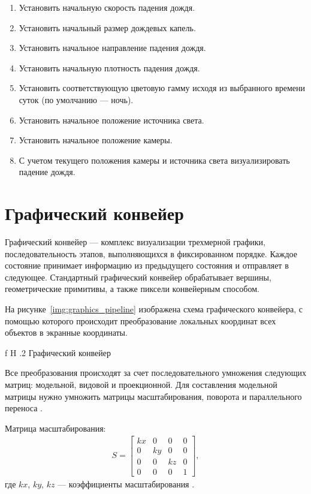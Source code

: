 \begin{enumerate}
\item Установить начальную скорость падения дождя.
\item Установить начальный размер дождевых капель.
\item Установить начальное направление падения дождя.
\item Установить начальную плотность падения дождя.
\item Установить соответствующую цветовую гамму исходя из выбранного времени суток (по умолчанию --- ночь).
\item Установить начальное положение источника света.
\item Установить начальное положение камеры.
\item С учетом текущего положения камеры и источника света визуализировать падение дождя.
\end{enumerate}

\section{Графический конвейер}

Графический конвейер --- комплекс визуализации трехмерной графики, последовательность этапов, выполняющихся в фиксированном порядке. 
Каждое состояние принимает информацию из предыдущего состояния и отправляет в следующее. 
Стандартный графический конвейер обрабатывает вершины, геометрические примитивы, а также пиксели конвейерным способом.

На рисунке~\ref{img:graphics_pipeline} изображена схема графического конвейера, с помощью которого происходит преобразование локальных координат всех объектов в экранные координаты.

    {f}
    {H}
    {.2\textwidth}
    {Графический конвейер}
    
Все преобразования происходят за счет последовательного умножения следующих матриц: модельной, видовой и проекционной. 
Для составления модельной матрицы нужно умножить матрицы масштабирования, поворота и параллельного переноса \cite{Jeremiah2011}. 

Матрица масштабирования:
\begin{equation}
\begin{gathered}
S = 
	\begin{bmatrix}
		kx & 0 & 0 & 0 \\
		0 & ky & 0 & 0 \\
		0 & 0 & kz & 0 \\
		0 & 0 & 0 & 1
	\end{bmatrix},
\end{gathered}
\end{equation}
где $kx$, $ky$, $kz$ --- коэффициенты масштабирования \cite{Panov2017}.

